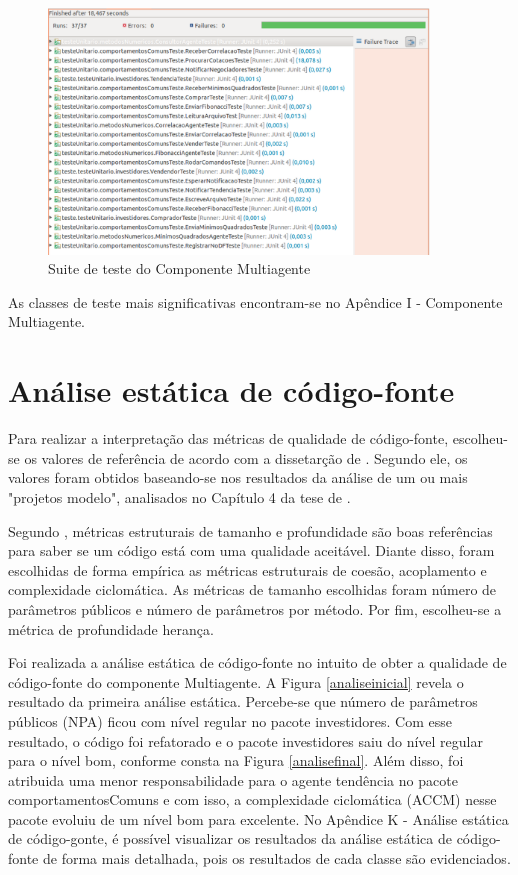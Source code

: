 \begin{figure}[H]
\centering
\includegraphics[width=0.9\textwidth]{figuras/eclemmaTodasClasses}
\caption{Suite de teste do Componente Multiagente}
\label{eclemmaTodasClasses}
\end{figure}

As classes de teste mais significativas encontram-se no Apêndice I - Componente Multiagente.

\section{Análise estática de código-fonte}
Para realizar a interpretação das métricas de qualidade de código-fonte, escolheu-se os valores de referência de acordo com a dissetarção de \cite{filho}. Segundo ele, os valores foram obtidos baseando-se nos resultados da análise de um ou mais "projetos
modelo", analisados no Capítulo 4 da tese de \cite{meirelles2013}.

Segundo \cite{braga2012}, métricas estruturais de tamanho e profundidade são boas referências para saber se um código está com uma qualidade aceitável. Diante disso, foram escolhidas de forma empírica as métricas estruturais de coesão, acoplamento e complexidade ciclomática. As métricas de tamanho escolhidas foram número de parâmetros públicos e número de parâmetros por método. Por fim, escolheu-se a métrica de profundidade herança.

Foi realizada a análise estática de código-fonte no intuito de obter a qualidade de código-fonte do componente Multiagente. A Figura \ref{analiseinicial} revela o resultado da primeira análise estática. Percebe-se que número de parâmetros públicos (NPA) ficou com nível regular no pacote investidores. Com esse resultado, o código foi refatorado e o pacote investidores saiu do nível regular para o nível bom, conforme consta na Figura \ref{analisefinal}. Além disso, foi atribuida uma menor responsabilidade para o agente tendência no pacote comportamentosComuns e com isso, a complexidade ciclomática (ACCM) nesse pacote evoluiu de um nível bom para excelente. No Apêndice K - Análise estática de código-gonte, é possível visualizar os resultados da análise estática de código-fonte de forma mais detalhada, pois os resultados de cada classe são evidenciados.

